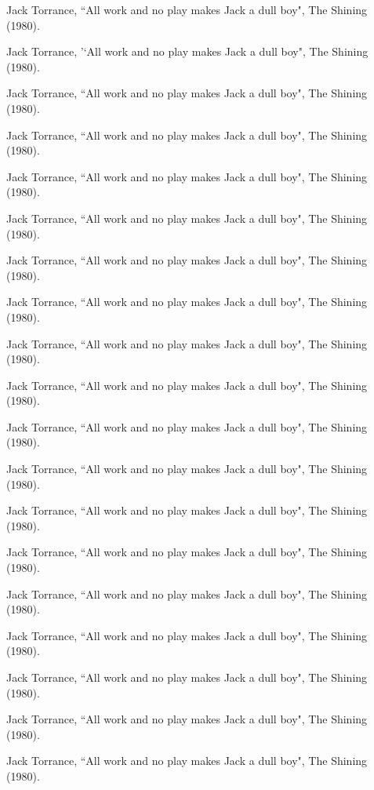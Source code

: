 	\item Jack Torrance, ``All work and no play makes Jack a dull boy", The Shining (1980).
	\item \hspace{5mm}Jack Torrance, '`All work and no play makes Jack a dull boy", The Shining (1980).
	\item \hspace{10mm}Jack Torrance, ``All work and no play makes Jack a dull boy", The Shining (1980).
	\item \hspace{15mm}Jack Torrance, ``All work and no play makes Jack a dull boy", The Shining (1980).
	\item \hspace{20mm}Jack Torrance, ``All work and no play makes Jack a dull boy", The Shining (1980).
	\item \hspace{25mm}Jack Torrance, ``All work and no play makes Jack a dull boy", The Shining (1980).
	\item \hspace{30mm}Jack Torrance, ``All work and no play makes Jack a dull boy", The Shining (1980).
	\item \hspace{25mm}Jack Torrance, ``All work and no play makes Jack a dull boy", The Shining (1980).
	\item \hspace{20mm}Jack Torrance, ``All work and no play makes Jack a dull boy", The Shining (1980).
	\item \hspace{15mm}Jack Torrance, ``All work and no play makes Jack a dull boy", The Shining (1980).
	\item \hspace{10mm}Jack Torrance, ``All work and no play makes Jack a dull boy", The Shining (1980).
	\item \hspace{5mm}Jack Torrance, ``All work and no play makes Jack a dull boy", The Shining (1980).
	\item Jack Torrance, ``All work and no play makes Jack a dull boy", The Shining (1980).
	\item \hspace{5mm}Jack Torrance, ``All work and no play makes Jack a dull boy", The Shining (1980).
	\item \hspace{10mm}Jack Torrance, ``All work and no play makes Jack a dull boy", The Shining (1980).
	\item \hspace{15mm}Jack Torrance, ``All work and no play makes Jack a dull boy", The Shining (1980).
	\item \hspace{20mm}Jack Torrance, ``All work and no play makes Jack a dull boy", The Shining (1980).
	\item \hspace{25mm}Jack Torrance, ``All work and no play makes Jack a dull boy", The Shining (1980).
	\item \hspace{30mm}Jack Torrance, ``All work and no play makes Jack a dull boy", The Shining (1980).
